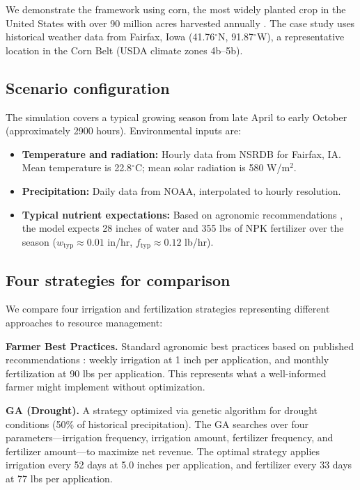 \documentclass[preprint,12pt]{elsarticle}
\begin{document}
We demonstrate the framework using corn, the most widely planted crop in the United States with over 90 million acres harvested annually \cite{fsa-acreage}. The case study uses historical weather data from Fairfax, Iowa (41.76$^{\circ}$N, 91.87$^{\circ}$W), a representative location in the Corn Belt (USDA climate zones 4b--5b).

\subsection{Scenario configuration}\label{subsec:scenario}

The simulation covers a typical growing season from late April to early October (approximately 2900 hours). Environmental inputs are:

\begin{itemize}
\item \textbf{Temperature and radiation:} Hourly data from NSRDB for Fairfax, IA. Mean temperature is 22.8$^{\circ}$C; mean solar radiation is 580 W/m$^{2}$.
\item \textbf{Precipitation:} Daily data from NOAA, interpolated to hourly resolution.
\item \textbf{Typical nutrient expectations:} Based on agronomic recommendations \cite{corn-nutrient-management}, the model expects 28 inches of water and 355 lbs of NPK fertilizer over the season ($w_{\text{typ}} \approx 0.01$ in/hr, $f_{\text{typ}} \approx 0.12$ lb/hr).
\end{itemize}

\subsection{Four strategies for comparison}\label{subsec:strategies}

We compare four irrigation and fertilization strategies representing different approaches to resource management:

\textbf{Farmer Best Practices.} Standard agronomic best practices based on published recommendations \cite{kranz2008irrigation,davies2020nitrogen}: weekly irrigation at 1 inch per application, and monthly fertilization at 90 lbs per application. This represents what a well-informed farmer might implement without optimization.

\textbf{GA (Drought).} A strategy optimized via genetic algorithm \cite{becker2025ga} for drought conditions (50\% of historical precipitation). The GA searches over four parameters---irrigation frequency, irrigation amount, fertilizer frequency, and fertilizer amount---to maximize net revenue. The optimal strategy applies irrigation every 52 days at 5.0 inches per application, and fertilizer every 33 days at 77 lbs per application.
\end{document}
